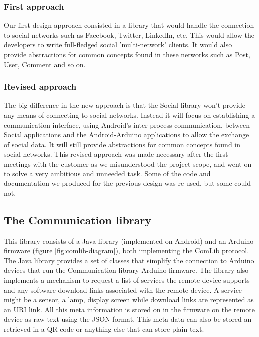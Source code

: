 
\subsubsection{First approach}
Our first design approach consisted in a library that would handle the connection to social networks
such as Facebook, Twitter, LinkedIn, etc. This would allow the developers to write full-fledged
social 'multi-network' clients. It would also provide abstractions for common concepts
found in these networks such as Post, User, Comment and so on.

\subsubsection{Revised approach}
The big difference in the new approach is that the Social library won't provide any means
of connecting to social networks. Instead it will focus on establishing a communication interface,
using Android's inter-process communication, between Social applications and the Android-Arduino applications
to allow the exchange of social data. It will still provide abstractions for common concepts
found in social networks. This revised approach was made necessary after the first meetings with the customer
as we misunderstood the project scope, and went on to solve a very ambitious and unneeded task.
Some of the code and documentation we produced for the previous design was re-used, but some could not.



\subsection{The Communication library}
This library consists of a Java library (implemented on Android) and an Arduino firmware (figure \ref{fig:comlib-diagram}),
both implementing the ComLib protocol. The Java library provides a set of classes that simplify the connection to Arduino
devices that run the Communication library Arduino firmware. The library also implements a mechanism to request a list of 
services the remote device supports and any software download links associated with the remote device. A service might
be a sensor, a lamp, display screen while download links are represented as an URI link. All this meta information is stored
on in the firmware on the remote device as raw text using the JSON format. This meta-data can also be stored an retrieved
in a QR code or anything else that can store plain text.

